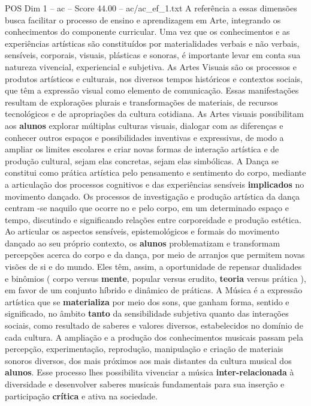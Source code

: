 \begin{textsample}{POS Dim 1 – ac – Score 44.00 – ac/ac\_ef\_1.txt}
A referência a essas dimensões busca facilitar o processo de ensino e aprendizagem em Arte, integrando os conhecimentos do componente curricular.
Uma vez que os conhecimentos e as experiências artísticas são constituídos por materialidades verbais e não verbais, sensíveis, corporais, visuais, plásticas e sonoras, é importante levar em conta sua natureza vivencial, experiencial e subjetiva.
As Artes Visuais são os processos e produtos artísticos e culturais, nos diversos tempos históricos e contextos sociais, que têm a expressão visual como elemento de comunicação.
Essas manifestações resultam de explorações plurais e transformações de materiais, de recursos tecnológicos e de apropriações da cultura cotidiana.
As Artes visuais possibilitam aos \textbf{alunos} explorar múltiplas culturas visuais, dialogar com as diferenças e conhecer outros espaços e possibilidades inventivas e expressivas, de modo a ampliar os limites escolares e criar novas formas de interação artística e de produção cultural, sejam elas concretas, sejam elas simbólicas.
A Dança se constitui como prática artística pelo pensamento e sentimento do corpo, mediante a articulação dos processos cognitivos e das experiências sensíveis \textbf{implicados} no movimento dançado.
Os processos de investigação e produção artística da dança centram -se naquilo que ocorre no e pelo corpo, em um determinado espaço e tempo, discutindo e significando relações entre corporeidade e produção estética.
Ao articular os aspectos sensíveis, epistemológicos e formais do movimento dançado ao seu próprio contexto, os \textbf{alunos} problematizam e transformam percepções acerca do corpo e da dança, por meio de arranjos que permitem novas visões de si e do mundo.
Eles têm, assim, a oportunidade de repensar dualidades e binômios ( corpo versus \textbf{mente}, popular versus erudito, \textbf{teoria} versus prática ), em favor de um conjunto híbrido e dinâmico de práticas.
A Música é a expressão artística que se \textbf{materializa} por meio dos sons, que ganham forma, sentido e significado, no âmbito \textbf{tanto} da sensibilidade subjetiva quanto das interações sociais, como resultado de saberes e valores diversos, estabelecidos no domínio de cada cultura.
A ampliação e a produção dos conhecimentos musicais passam pela percepção, experimentação, reprodução, manipulação e criação de materiais sonoros diversos, dos mais próximos aos mais distantes da cultura musical dos \textbf{alunos}.
Esse processo lhes possibilita vivenciar a música \textbf{inter-relacionada} à diversidade e desenvolver saberes musicais fundamentais para sua inserção e participação \textbf{crítica} e ativa na sociedade.

\end{textsample}
